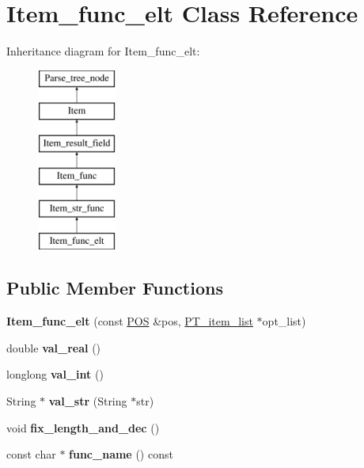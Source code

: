 \hypertarget{classItem__func__elt}{}\section{Item\+\_\+func\+\_\+elt Class Reference}
\label{classItem__func__elt}
Inheritance diagram for Item\+\_\+func\+\_\+elt\+:\begin{figure}[H]
\begin{center}
\leavevmode
\includegraphics[height=6.000000cm]{classItem__func__elt}
\end{center}
\end{figure}
\subsection*{Public Member Functions}
\begin{DoxyCompactItemize}
\item 
\mbox{\label{classItem__func__elt_acec1fa9f377ecc89a62f2b4d309d3389}} 
{\bfseries Item\+\_\+func\+\_\+elt} (const \mbox{\hyperlink{structYYLTYPE}{P\+OS}} \&pos, \mbox{\hyperlink{classPT__item__list}{P\+T\+\_\+item\+\_\+list}} $\ast$opt\+\_\+list)
\item 
\mbox{\label{classItem__func__elt_a936b028f53996b428e71f0107db117a6}} 
double {\bfseries val\+\_\+real} ()
\item 
\mbox{\label{classItem__func__elt_ae06f0f7d8a47eb7b5ad0348160405cb5}} 
longlong {\bfseries val\+\_\+int} ()
\item 
\mbox{\label{classItem__func__elt_a8364da55e307527007ed8fd9d80d02b2}} 
String $\ast$ {\bfseries val\+\_\+str} (String $\ast$str)
\item 
\mbox{\label{classItem__func__elt_a81358b5e72b573d1042498060b9932fa}} 
void {\bfseries fix\+\_\+length\+\_\+and\+\_\+dec} ()
\item 
\mbox{\label{classItem__func__elt_a2e42fb183d89eedea40cb79208c5f5f9}} 
const char $\ast$ {\bfseries func\+\_\+name} () const
\end{DoxyCompactItemize}

